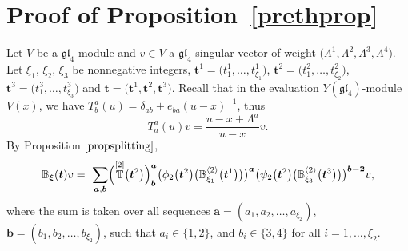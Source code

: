 \documentclass[10pt,a4paper]{amsart}
\numberwithin{equation}{section}
\newcommand\ltwo{\langle 2\rangle}
\begin{document}
\section{Proof of Proposition~\ref{prethprop}}\label{section5}
Let $V$ be a $\mathfrak{gl}_4$-module and $v\in V$ a $\mathfrak{gl}_4$-singular vector of weight $\bigl(\Lambda^1,\Lambda^2,\Lambda^3,\Lambda^4\bigr)$. Let $\xi_1$, $\xi_2$, $\xi_3$ be nonnegative integers, $\boldsymbol{t}^1=\bigl(t^1_1,\dots,t^1_{\xi_1}\bigr)$, $\boldsymbol{t}^2=\bigl(t^2_1,\dots,t^2_{\xi_2}\bigr)$, $\boldsymbol{t}^3=\bigl(t^3_1,\dots,t^3_{\xi_3}\bigr)$ and $\boldsymbol{t}=\bigl(\boldsymbol{t}^1,\boldsymbol{t}^2,\boldsymbol{t}^3\bigr)$.
Recall that in the evaluation $Y(\mathfrak{gl}_4)$-module $V(x)$, we have $T^a_b(u)=\delta_{ab}+ e_{ba}(u-x)^{-1}$, thus
\begin{equation*}T^a_a(u)v=\frac{u-x+\Lambda^a}{u-x} v.\end{equation*}
By Proposition $\ref{propsplitting}$,
\begin{equation}\label{step1}
{\mathbb{B}}_{\boldsymbol{\xi}}(\boldsymbol{t})v =\
\sum_{\boldsymbol{a},\boldsymbol{b}} \Bigl( \overset{[2]}{\mathbb{T}} \bigl(\boldsymbol{t}^{2}\bigr)\Bigr)^{\boldsymbol{a}}_{\boldsymbol{b}} \bigl(\phi_2\bigl(\boldsymbol{t}^ 2\bigr)\bigl(\mathbb{B}_{\xi_1}^{\ltwo}\bigl(\boldsymbol{t}^{1}\bigr)\bigr)\bigr)^{\boldsymbol{a}} \bigl(\psi_2\bigl(\boldsymbol{t}^{2}\bigr)\bigl(\mathbb{B}_{\xi_3}^{\ltwo}\bigl(\boldsymbol{t}^{ 3}\bigr)\bigr)\bigr)^{\boldsymbol{b-2}} v,
\end{equation}
where the sum is taken over all sequences $\boldsymbol{a}=(a_1,a_2,\dots,a_{\xi_2})$, $\boldsymbol{b}=(b_1,b_2,\dots,b_{\xi_2})$, such that $a_i\in \{1,2\}$, and $b_i\in \{3,4\}$ for all $i=1,\dots,\xi_2$.
\end{document}
